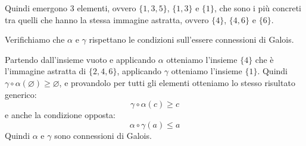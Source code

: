 Quindi emergono 3 elementi, ovvero $\{1,3,5\}$, $\{1,3\}$ e $\{1\}$,
che sono i più concreti tra quelli che hanno la stessa 
immagine astratta, ovvero $\{4\}$, $\{4,6\}$ e $\{6\}$.

Verifichiamo che $\alpha$ e $\gamma$ rispettano le condizioni sull'essere 
connessioni di Galois.

Partendo dall'insieme vuoto e applicando $\alpha$ otteniamo l'insieme
$\{4\}$ che è l'immagine astratta di $\{ 2,4,6 \}$, applicando $\gamma$
otteniamo l'insieme $\{1\}$. Quindi
$\gamma \circ \alpha(\varnothing) \geq \varnothing$, e provandolo per tutti 
gli elementi otteniamo lo stesso risultato generico:
\[
  \gamma \circ \alpha(c) \geq c  
\]
e anche la condizione opposta:
\[
  \alpha \circ \gamma(a) \leq a
\]
Quindi $\alpha$ e $\gamma$ sono connessioni di Galois.

